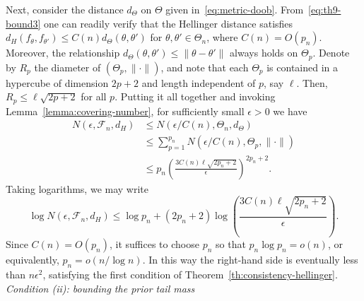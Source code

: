Next, consider the distance \(d_\Theta\) on \(\Theta\) given in~\eqref{eq:metric-doob}. From~\eqref{eq:th9-bound3} one can readily verify that the Hellinger distance satisfies \(d_H(f_\theta, f_{\theta'}) \leq C(n) d_\Theta(\theta, \theta')\) for \(\theta, \theta' \in \Theta_n\), where \(C(n)=O(p_n)\). Moreover, the relationship \(d_\Theta(\theta,\theta')\leq \|\theta - \theta'\|\) always holds on \(\Theta_p\). Denote by \(R_p\) the diameter of \((\Theta_p, \|\cdot\|)\), and note that each \(\Theta_p\) is contained in a hypercube of dimension \(2p+2\) and length independent of \(p\), say \(\ell\). Then, \(R_p\leq \ell\sqrt{2p+2}\) for all \(p\). Putting it all together and invoking Lemma~\ref{lemma:covering-number}, for sufficiently small \(\epsilon>0\) we have
\begin{align*}
  N(\epsilon, \mathcal F_n, d_H) & \leq N(\epsilon/C(n), \Theta_n, d_\Theta)                               \\
                                 & \leq \sum_{p=1}^{p_n} N(\epsilon/C(n), \Theta_p, \|\cdot\|)             \\
                                 & \leq p_n \left(\frac{3C(n)\ell\sqrt{2p_n+2}}{\epsilon}\right)^{2p_n+2}.
\end{align*}
Taking logarithms, we may write
\begin{equation}\label{eq:th9-bound-covering}
  \log N(\epsilon, \mathcal F_n, d_H) \leq \log p_n + (2p_n+2) \log\left(\frac{3C(n) \ell\sqrt{2p_n+2}}{\epsilon}\right).
\end{equation}
Since \(C(n)=O(p_n)\), it suffices to choose \(p_n\) so that \(p_n\log p_n = o(n)\), or equivalently, \(p_n=o\left(n/\log n\right)\). In this way the right-hand side is eventually less than \(n\epsilon^2\), satisfying the first condition of Theorem~\ref{th:consistency-hellinger}.\\

\noindent\textit{Condition (ii): bounding the prior tail mass}

